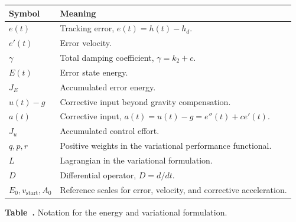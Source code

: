 ﻿\documentclass[12pt]{article}
\begin{document}
\begin{center}
\label{tab:energy-notation}
\centering
\begin{tabular}{|>{\centering\arraybackslash}p{2.4cm}|>{\raggedright\arraybackslash}p{11.2cm}|}
\hline
\textbf{Symbol} & \textbf{Meaning} \\
\hline
$e(t)$ & Tracking error, $e(t) = h(t) - h_d$. \\
\hline
$e'(t)$ & Error velocity. \\
\hline
$\gamma$ & Total damping coefficient, $\gamma = k_2 + c$. \\
\hline
$E(t)$ & Error state energy. \\
\hline
$J_E$ & Accumulated error energy. \\
\hline
$u(t) - g$ & Corrective input beyond gravity compensation. \\
\hline
$a(t)$ & Corrective input, $a(t) = u(t) - g = e''(t) + ce'(t)$. \\
\hline
$J_u$ & Accumulated control effort. \\
\hline
$q, p, r$ & Positive weights in the variational performance functional. \\
\hline
$L$ & Lagrangian in the variational formulation. \\
\hline
$D$ & Differential operator, $D = d/dt$. \\
\hline
$E_0, v_{\mathrm{start}}, A_0$ & Reference scales for error, velocity, and corrective acceleration. \\
\hline
\end{tabular}
\par\smallskip
\textbf{Table~\thetable.} Notation for the energy and variational formulation.
\end{center}
\end{document}
